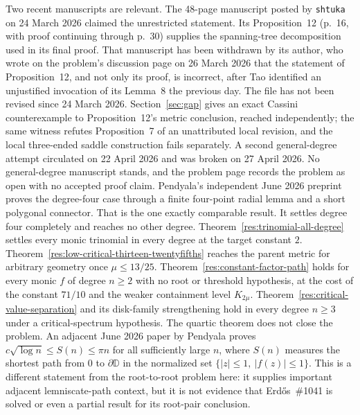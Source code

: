 Two recent manuscripts are relevant.  The 48-page manuscript posted by
\texttt{shtuka} on 24 March 2026
\cite[Theorem~1, p.~1]{march2026} claimed the unrestricted
statement.  Its Proposition~12 (p.~16, with proof continuing through p.~30)
supplies the spanning-tree decomposition used in its final proof.  That
manuscript has been withdrawn by its author, who wrote on the problem's
discussion page on 26 March 2026 that the statement of Proposition~12, and not
only its proof, is incorrect, after Tao identified an unjustified invocation of
its Lemma~8 the previous day.  The file has not been revised since 24 March
2026.  Section~\ref{sec:gap} gives an exact Cassini counterexample to
Proposition~12's metric conclusion, reached independently; the same witness
refutes Proposition~7 of an unattributed local revision, and the local
three-ended saddle construction fails separately.  A second general-degree
attempt circulated on 22 April 2026 and was broken on 27 April 2026.  No
general-degree manuscript stands, and the problem page records the problem as
open with no accepted proof claim.  Pendyala's independent June 2026
preprint \cite[Thm.~1, p.~1]{june2026} proves the degree-four case through a
finite four-point radial lemma and a short polygonal connector.  That is the
one exactly comparable result.  It settles degree four completely and reaches
no other degree.  Theorem~\ref{res:trinomial-all-degree} settles every monic
trinomial in every degree at the target constant $2$.
Theorem~\ref{res:low-critical-thirteen-twentyfifths} reaches the parent metric
for arbitrary geometry once $\mu\le13/25$.
Theorem~\ref{res:constant-factor-path} holds for every monic $f$ of degree
$n\ge2$ with no root or threshold hypothesis, at the cost of the constant
$71/10$ and the weaker containment level $K_{2\mu}$.
Theorem~\ref{res:critical-value-separation} and its disk-family strengthening
hold in every degree $n\ge3$ under a critical-spectrum hypothesis.  The quartic theorem does
not close the problem.  An adjacent June 2026 paper by Pendyala
\cite[Thm.~1.2, p.~2; introductory discussion, pp.~1--2]{pendyala2026shortest}
proves $c\sqrt{\log n}\leq S(n)\leq\pi n$ for all sufficiently large $n$,
where $S(n)$ measures the shortest path from $0$ to $\partial\mathbb D$ in
the normalized set $\{|z|\leq1,\ |f(z)|\leq1\}$.  This is a different
statement from the root-to-root problem here: it supplies important adjacent
lemniscate-path context, but it is not evidence that Erd\H{o}s~\#1041 is
solved or even a partial result for its root-pair conclusion.

